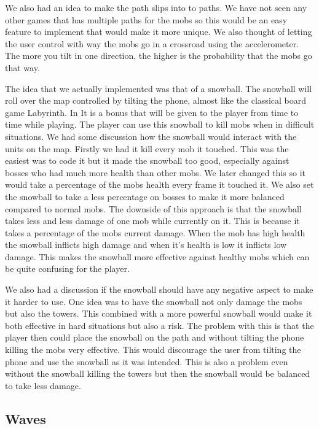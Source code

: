 We also had an idea to make the path slips into to paths. We have not seen any other games that has multiple paths for the mobs so this would be an easy feature to implement that would make it more unique. We also thought of letting the user control with way the mobs go in a crossroad using the accelerometer. The more you tilt in one direction, the higher is the probability that the mobs go that way.

The idea that we actually implemented was that of a snowball. The snowball will roll over the map controlled by tilting the phone, almost like the classical board game Labyrinth. In It is a bonus that will be given to the player from time to time while playing. The player can use this snowball to kill mobs when in difficult situations. We had some discussion how the snowball would interact with the units on the map. Firstly we had it kill every mob it touched. This was the easiest was to code it but it made the snowball too good, especially against bosses who had much more health than other mobs. We later changed this so it would take a percentage of the mobs health every frame it touched it. We also set the snowball to take a less percentage on bosses to make it more balanced compared to normal mobs. The downside of this approach is that the snowball takes less and less damage of one mob while currently on it. This is because it takes a percentage of the mobs current damage. When the mob has high health the snowball inflicts high damage and when it's health is low it inflicts low damage. This makes the snowball more effective against healthy mobs which can be quite confusing for the player.

We also had a discussion if the snowball should have any negative aspect to make it harder to use. One idea was to have the snowball not only damage the mobs but also the towers. This combined with a more powerful snowball would make it both effective in hard situations but also a risk. The problem with this is that the player then could place the snowball on the path and without tilting the phone killing the mobs very effective. This would discourage the user from tilting the phone and use the snowball as it was intended. This is also a problem even without the snowball killing the towers but then the snowball would be balanced to take less damage.
\subsection{Waves}

